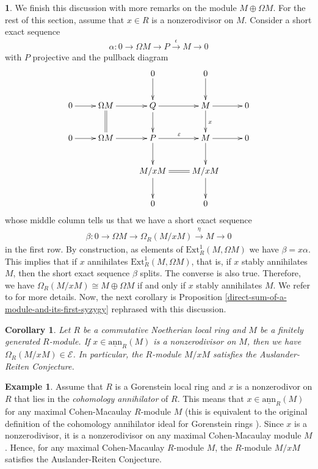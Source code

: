 \documentclass[12pt]{amsart}
\newcommand{\Ext}{\mathrm{Ext}}
\newcommand{\sann}{\underline{\mathrm{ann}}}
\newcommand{\EE}{\mathcal{E}}
\newtheorem{corollary}[theorem]{Corollary}
\theoremstyle{definition}
\newtheorem{example}[theorem]{Example}
\newtheorem{chunk}[theorem]{}
\numberwithin{equation}{theorem}
\begin{document}
\begin{chunk}
    We finish this discussion with more remarks on the module $M \oplus \Omega M$. For the rest of this section, assume that $x \in R$ is a nonzerodivisor on $M$. Consider a short exact sequence
    \begin{align*}
        \alpha \colon 0 \to \Omega M \to P \xrightarrow{\epsilon} M \to 0
    \end{align*}
    with $P$ projective and the pullback diagram
    \begin{align*}
        \xymatrix{
                 &    & 0 \ar[d]   & 0 \ar[d] \\
    0 \ar[r] & \Omega M \ar[r] \ar@{=}[d]  & Q \ar[r] \ar[d] & M \ar[r]
    \ar[d]^{x} & 0 \\
    0 \ar[r] & \Omega M \ar[r]  & P \ar[r]^{\varepsilon} \ar[d] & M \ar[r] \ar[d] &
          0\\
                  &    & M/xM \ar@{=}[r] \ar[d]  & M/xM \ar[d] \\
                  &    & 0          & 0
        }
    \end{align*}
    whose middle column tells us that we have a short exact sequence
    \begin{align}\label{definition-of-beta}
        \beta \colon 0 \to \Omega M \to \Omega_R(M/xM) \xrightarrow{\eta} M \to 0
    \end{align}
    in the first row. By construction, as elements of $\Ext_R^1(M,\Omega M)$ we have $\beta = x \alpha$. This implies that if $x$ annihilates $\Ext_R^1(M,\Omega M)$, that is, if $x$ stably annihilates $M$, then the short exact sequence $\beta$ splits. The converse is also true. Therefore, we have $\Omega_R(M/xM) \cong M \oplus \Omega M$ if and only if $x$ stably annihilates $M$. We refer to \cite[Section 2]{Dugas-Leuschke} for more details. Now, the next corollary is Proposition \ref{direct-sum-of-a-module-and-its-first-syzygy} rephrased with this discussion.
    \begin{corollary}
        Let $R$ be a commutative Noetherian local ring and $M$ be a finitely generated $R$-module. If $x \in \sann_R(M)$ is a nonzerodivisor on $M$, then we have  $\Omega_R(M/xM) \in \EE$. In particular, the $R$-module $M/xM$ satisfies the Auslander-Reiten Conjecture.
    \end{corollary}

    \begin{example}
        Assume that $R$ is a Gorenstein local ring and $x$ is a nonzerodivor on $R$ that lies in the \textit{cohomology annihilator} of $R$. This means that $x \in \sann_R(M)$ for any maximal Cohen-Macaulay $R$-module $M$ (this is equivalent to the original definition of the cohomology annihilator ideal \cite[Definition 2.1]{Iyengar-Takahashi} for Gorenstein rings \cite[Lemma 2.3]{Esentepe}). Since $x$ is a nonzerodivisor, it is a nonzerodivisor on any maximal Cohen-Macaulay module $M$. Hence, for any maximal Cohen-Macaulay $R$-module $M$, the $R$-module $M/xM$ satisfies the Auslander-Reiten Conjecture.
    \end{example}


\end{chunk}
\end{document}
